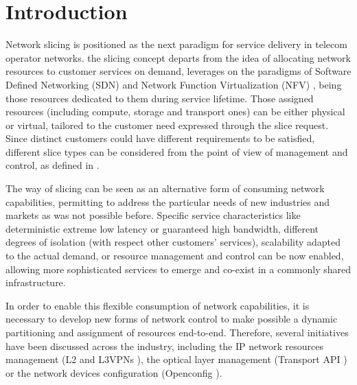 \documentclass[journal,article,submit,moreauthors,pdftex]{Definitions/mdpi}
\begin{document}

\section{Introduction}

Network slicing is positioned as the next paradigm for service delivery in telecom operator networks. the slicing concept departs from the idea of allocating network resources to customer services on demand, leverages on the paradigms of Software Defined Networking (SDN) and Network Function Virtualization (NFV) \cite{ordonez2017network}, being those resources dedicated to them during service lifetime. Those assigned resources (including compute, storage and transport ones) can be either physical or virtual, tailored to the customer need expressed through the slice request. Since distinct customers could have different requirements to be satisfied, different slice types can be considered from the point of view of management and control, as defined in \cite{contreras2017network}.

The way of slicing can be seen as an alternative form of consuming network capabilities, permitting to address the particular needs of new industries and markets \cite{ordonez2017network} as was not possible before. Specific service characteristics like deterministic extreme low latency or guaranteed high bandwidth, different degrees of isolation (with respect other customers’ services), scalability adapted to the actual demand, or  resource management and control can be now enabled, allowing more sophisticated services to emerge and co-exist in a commonly shared infrastructure.

In order to enable this flexible consumption of network capabilities, it is necessary to develop new forms of network control to make possible a dynamic partitioning and assignment of resources end-to-end. Therefore, several initiatives have been discussed across the industry, including the IP network resources management (L2 \cite{barguil2021l2nm} and L3VPNs \cite{Aguado.2021l3nm}), the optical layer management (Transport API \cite{vilalta2018experimental}) or the network devices configuration (Openconfig \cite{shaikhopenconfig}).

\end{document}
